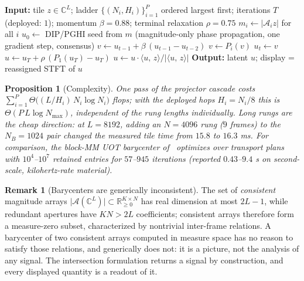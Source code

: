 \documentclass[11pt]{article}
\newtheorem{proposition}[theorem]{Proposition}
\theoremstyle{definition}
\newtheorem{remark}[theorem]{Remark}
\newcommand{\C}{\mathbb{C}}
\newcommand{\R}{\mathbb{R}}
\newcommand{\cA}{\mathcal{A}}
\newcommand{\ip}[2]{\langle #1,\,#2\rangle}
\newcommand{\abs}[1]{\lvert #1\rvert}
\begin{document}
\begin{algorithm}[h]
\caption{Unified ladder solve (one tile; \texttt{iqw\_dip\_unified\_ladder})}
\begin{algorithmic}[1]
\State \textbf{Input:} tile $z\in\C^{L}$; ladder $\{(N_{i},H_{i})\}_{i=1}^{P}$
       ordered largest first; iterations $T$ (deployed: $1$);
       momentum $\beta=0.88$; terminal relaxation $\rho=0.75$
\State $m_{i}\gets\abs{\cA_{i}z}$ for all $i$
\State $u_{0}\gets$ DIP/PGHI seed from $m$ (magnitude-only phase
       propagation, one gradient step, consensus) 
  \State $v\gets u_{t-1}+\beta\,(u_{t-1}-u_{t-2})$ 
   $v\gets P_{i}(v)$ 
  \EndFor
  \State $u_{t}\gets v$
\EndFor
\State $u\gets u_{T}+\rho\,(P_{1}(u_{T})-u_{T})$
\State $u\gets u\cdot\ip{u}{z}/\abs{\ip{u}{z}}$
\State \textbf{Output:} latent $u$; display = reassigned STFT of $u$
\end{algorithmic}
\end{algorithm}

\begin{proposition}[Complexity]\label{prop:complexity}
One pass of the projector cascade costs
$\sum_{i=1}^{P}\Theta\bigl((L/H_{i})\,N_{i}\log N_{i}\bigr)$ flops; with
the deployed hops $H_{i}=N_{i}/8$ this is $\Theta(P\,L\log N_{\max})$,
independent of the rung lengths individually.  Long rungs are the cheap
direction: at $L=8192$, adding an $N=4096$ rung ($9$ frames) to the
$N_B=1024$ pair changed the measured tile time from $15.8$ to $16.3$ ms.
For comparison, the block-MM UOT barycenter of~\cite{valdivia2026}
optimizes over transport plans with $10^{4}$--$10^{7}$ retained entries for
$57$--$945$ iterations (reported $0.43$--$9.4$ s on second-scale,
kilohertz-rate material).
\end{proposition}

\begin{remark}[Barycenters are generically inconsistent]\label{rem:consistency}
The set of \emph{consistent} magnitude arrays
$\abs{\cA(\C^{L})}\subset\R_{\ge0}^{K\times N}$ has real dimension at most
$2L-1$, while redundant apertures have $KN>2L$ coefficients; consistent
arrays therefore form a measure-zero subset, characterized by nontrivial
inter-frame relations.  A barycenter of two consistent arrays computed in
measure space has no reason to satisfy those relations, and generically
does not: it is a picture, not the analysis of any signal.  The intersection
formulation returns a signal by construction, and every displayed quantity
is a readout of it.
\end{remark}
\end{document}
